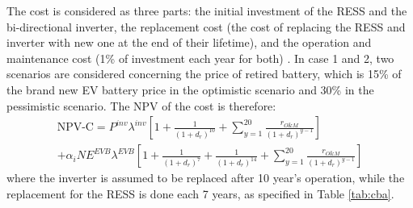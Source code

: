 \documentclass[final,5p,times,twocolumn,authoryear]{elsarticle}
\begin{document}
The cost is considered as three parts: the initial investment of the RESS and the bi-directional inverter, the replacement cost (the cost of replacing the RESS and inverter with new one at the end of their lifetime), and the operation and maintenance cost (1\% of investment each year for both) \cite{Zhang2017ComparativeOperation}. In case 1 and 2, two scenarios are considered concerning the price of retired battery, which is 15\% of the brand new EV battery price in the optimistic scenario and 30\% in the pessimistic scenario. The NPV of the cost is therefore:
\begin{equation} \label{eq:cost}
\begin{split}
 \text{NPV-C} = P^{inv}\lambda^{inv}[1+\frac{1}{(1+d_r)^{10}}+ \sum_{y =1}^{20} \frac{r_{O\&M}}{(1+d_r)^{y-1}}]\\
 +\alpha_i N E^{EVB} \lambda^{EVB} [1+\frac{1}{(1+d_r)^{7}}+\frac{1}{(1+d_r)^{14}} + \sum_{y =1}^{20}\frac{r_{O\&M}}{(1+d_r)^{y-1}}]  
\end{split}
\end{equation}
where the inverter is assumed to be replaced after 10 year's operation, while the replacement for the RESS is done each 7 years, as specified in Table \ref{tab:cba}.\\
\end{document}

